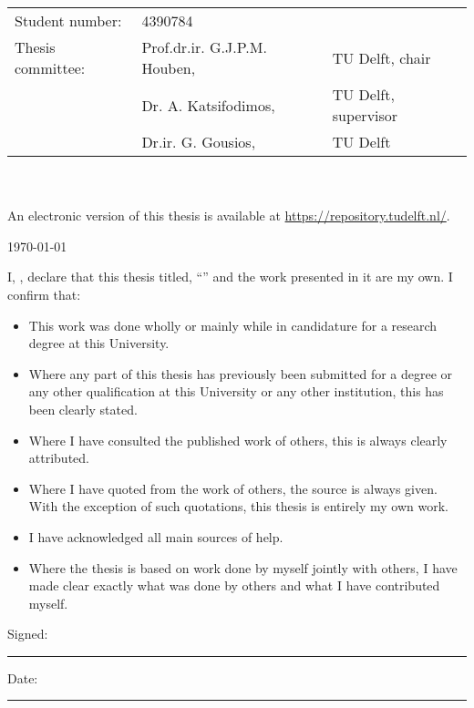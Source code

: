 \documentclass[
11pt, %
english, %
singlespacing, %
headsepline, %
]{MastersDoctoralThesis} %
\begin{document}
\begin{titlepage}
\begin{center}
\vfill
\begin{tabular}{lll}
Student number: & 4390784 & \\
Thesis committee: & Prof.dr.ir. G.J.P.M. Houben, & TU Delft, chair \\
& Dr. A. Katsifodimos, & TU Delft, supervisor \\
& Dr.ir. G. Gousios, & TU Delft \\
\end{tabular}

~\\~\\An electronic version of this thesis is available at \url{https://repository.tudelft.nl/}.
\vfill

{\large \today}\\[4cm] %
 
\vfill
\end{center}
\end{titlepage}


\begin{declaration}
\addchaptertocentry{\authorshipname} %
\noindent I, \authorname, declare that this thesis titled, \enquote{\ttitle} and the work presented in it are my own. I confirm that:

\begin{itemize} 
\item This work was done wholly or mainly while in candidature for a research degree at this University.
\item Where any part of this thesis has previously been submitted for a degree or any other qualification at this University or any other institution, this has been clearly stated.
\item Where I have consulted the published work of others, this is always clearly attributed.
\item Where I have quoted from the work of others, the source is always given. With the exception of such quotations, this thesis is entirely my own work.
\item I have acknowledged all main sources of help.
\item Where the thesis is based on work done by myself jointly with others, I have made clear exactly what was done by others and what I have contributed myself.\\
\end{itemize}
 
\noindent Signed:\\
\rule[0.5em]{25em}{0.5pt} %
 
\noindent Date:\\
\rule[0.5em]{25em}{0.5pt} %
\end{declaration}
\end{document}
